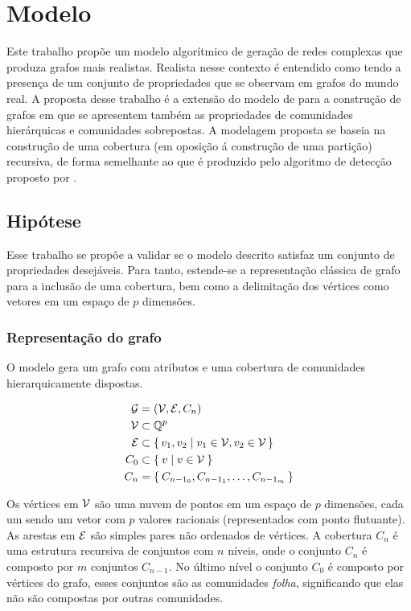 \documentclass[notes.tex]{subfiles}
\begin{document}
\chapter{Modelo}

Este trabalho propõe um modelo algorítmico de geração de redes complexas que produza grafos mais realistas.
Realista nesse contexto é entendido como tendo a presença de um conjunto de propriedades que se observam em grafos do mundo real.
A proposta desse trabalho é a extensão do modelo de  para a construção de grafos em que se apresentem também as propriedades de comunidades hierárquicas e comunidades sobrepostas.
A modelagem proposta se baseia na construção de uma cobertura (em oposição á construção de uma partição) recursiva, de forma semelhante ao que é produzido pelo algoritmo de detecção proposto por .


\section{Hipótese}

Esse trabalho se propõe a validar se o modelo descrito satisfaz um conjunto de propriedades desejáveis.
Para tanto, estende-se a representação clássica de grafo para a inclusão de uma cobertura, bem como a delimitação dos vértices como vetores em um espaço de $p$ dimensões.

\subsection{Representação do grafo}

O modelo gera um grafo com atributos e uma cobertura de comunidades hierarquicamente dispostas.

\begin{equation}
\begin{split}
    \operatorname{\mathcal{G}} &= (\operatorname{\mathcal{V}}, \operatorname{\mathcal{E}}, C_n) \\
    \operatorname{\mathcal{V}} &\subset  \mathbb{Q}^{p} \\
    \operatorname{\mathcal{E}} &\subset \set{v_1, v_2 | v_1 \in \operatorname{\mathcal{V}}, v_2 \in \operatorname{\mathcal{V}}} \\
     C_0 &\subset \Set{v | v \in \operatorname{\mathcal{V}}} \\
     C_n &= \Set{C_{n-1_0}, C_{n-1_1}, \ldots, C_{n-1_m}} \\
\end{split}
\end{equation}

Os vértices em $\operatorname{\mathcal{V}}$ são uma nuvem de pontos em um espaço de $p$ dimensões, cada um sendo um vetor com $p$ valores racionais (representados com ponto flutuante).
As arestas em $\operatorname{\mathcal{E}}$ são simples pares não ordenados de vértices.
A cobertura $C_n$ é uma estrutura recursiva de conjuntos com $n$ níveis, onde o conjunto $C_n$ é composto por $m$ conjuntos $C_{n-1}$.
No último nível o conjunto $C_0$ é composto por vértices do grafo, esses conjuntos são as comunidades \emph{folha}, significando que elas não são compostas por outras comunidades.
\end{document}

